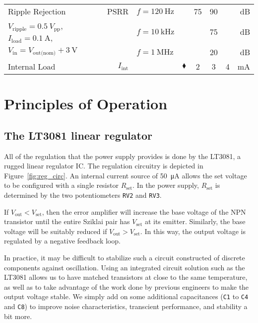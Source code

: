 \documentclass[letterpaper,twocolumn,11pt]{article}
\newcommand{\refdes}[1]{\texttt{#1}}
\newcommand{\wtemp}{\ensuremath{\blacklozenge}}
\begin{document}
\begin{table*}[ht]
{\begin{tabular}{lr|lr|cccr}
      Ripple Rejection
      & PSRR & $f = \SI{120}{\Hz}$ & & 75 & 90 & & \si{\dB} \\

      $V_\text{ripple} = \SI{0.5}{V_{\text{pp}}}$,
      $I_\text{load} = \SI{0.1}{\A}$, &
      & $f = \SI{10}{\kHz}$ & & & 75 & & \si{\dB} \\

      $V_\text{in} = V_\text{out(nom)} + \SI{3}{\V}$ &
      & $f = \SI{1}{\MHz}$ & & & 20 & & \si{\dB} \\

      Internal Load & $I_\text{int}$ & & \wtemp & 2 & 3 & 4 & \si{\mA} \\
      \bottomrule
  \end{tabular}}
  \label{tab:chars}
\end{table*}

\section{Principles of Operation}

\subsection{The LT3081 linear regulator}\label{sec:lt3081}

All of the regulation that the power supply provides is done by the LT3081, a
rugged linear regulator IC. The regulation circuitry is depicted in
Figure~\ref{fig:reg_circ}. An internal current source of \SI{50}{\uA} allows the
set voltage to be configured with a single resistor $R_\text{set}$. In the power
supply, $R_\text{set}$ is determined by the two potentiometers \refdes{RV2} and
\refdes{RV3}.

If $V_\text{out} < V_\text{set}$, then the error amplifier will increase the
base voltage of the NPN transistor until the entire Sziklai pair has
$V_\text{set}$ at its emitter. Similarly, the base voltage will be suitably
reduced if $V_\text{out} > V_\text{set}$. In this way, the output voltage is
regulated by a negative feedback loop.

In practice, it may be difficult to stabilize such a circuit constructed of
discrete components against oscillation. Using an integrated circuit solution
such as the LT3081 allows us to have matched transistors at close to the same
temperature, as well as to take advantage of the work done by previous engineers
to make the output voltage stable. We simply add on some additional capacitances
(\refdes{C1} to \refdes{C4} and \refdes{C8}) to improve noise characteristics,
transcient performance, and stability a bit more.
\end{document}
